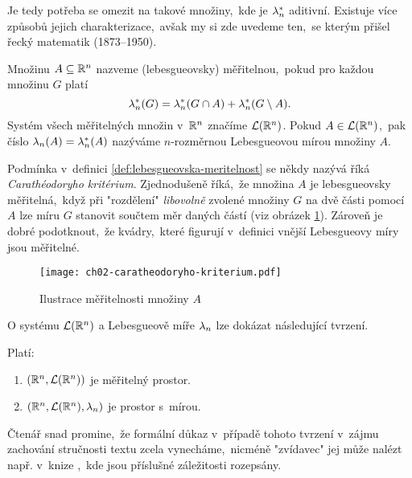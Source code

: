 Je tedy potřeba se omezit na takové množiny,~kde je $\lambda_n^*$ aditivní. Existuje více způsobů jejich charakterizace,~avšak my si zde uvedeme ten,~se kterým přišel řecký matematik  (1873--1950).
\begin{definition}\label{def:lebesgueovska-meritelnost}
    Množinu $A\subseteq\mathbb{R}^n$ nazveme (lebesgueovsky) měřitelnou,~pokud pro každou množinu $G$ platí
    \[\lambda_n^*(G)=\lambda_n^*(G\cap A)+\lambda_n^*(G\setminus A).\]
    Systém všech měřitelných množin v~$\mathbb{R}^n$ značíme $\mathcal{L}(\mathbb{R}^n)$.  Pokud $A\in\mathcal{L}(\mathbb{R}^n)$,~pak číslo $\lambda_n(A)=\lambda_n^*(A)$ nazýváme $n$-rozměrnou Lebesgueovou mírou množiny $A$.
\end{definition}
Podmínka v~definici \ref{def:lebesgueovska-meritelnost} se někdy nazývá říká \emph{Carathéodoryho kritérium}. Zjednodušeně říká,~že množina $A$ je lebesgueovsky měřitelná,~když při "rozdělení" \emph{libovolně} zvolené množiny $G$ na dvě části pomocí $A$ lze míru $G$ stanovit součtem měr daných částí (viz obrázek \ref{fig:caratheodoryho-kriterium}). Zároveň je dobré podotknout,~že kvádry,~které figurují v~definici vnější Lebesgueovy míry jsou měřitelné.
\begin{figure}[h]
    \centering
    \texttt{[image: ch02-caratheodoryho-kriterium.pdf]}
    \caption{Ilustrace měřitelnosti množiny $A$}
    \label{fig:caratheodoryho-kriterium}
\end{figure}
O systému $\mathcal{L}(\mathbb{R}^n)$ a Lebesgueově míře $\lambda_n$ lze dokázat následující tvrzení.
\begin{theorem}\label{thm:prostor-s-Lebesgueovou-mirou}
    Platí:
    \begin{enumerate}[label=(\roman*)]
        \item $(\mathbb{R}^n,\mathcal{L}(\mathbb{R}^n))$ je měřitelný prostor.
        \item $(\mathbb{R}^n,\mathcal{L}(\mathbb{R}^n),\lambda_n)$ je prostor s~mírou.
    \end{enumerate}
\end{theorem}
Čtenář snad promine,~že formální důkaz v~případě tohoto tvrzení v~zájmu zachování stručnosti textu zcela vynecháme,~nicméně "zvídavec" jej může nalézt např. v~knize \citep[str. 347]{Royden2010},~kde jsou příslušné záležitosti rozepsány.